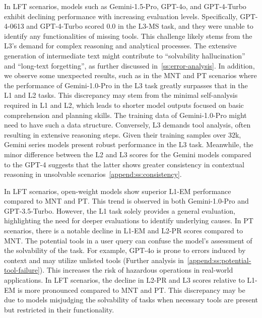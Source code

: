 \documentclass[11pt]{article}
\begin{document}
In LFT scenarios, models such as Gemini-1.5-Pro, GPT-4o, and GPT-4-Turbo exhibit declining performance with increasing evaluation levels. 
Specifically, GPT-4-0613 and GPT-4-Turbo scored $0.0$ in the L3-MS task, and they were unable to identify any functionalities of missing tools.
This challenge likely stems from the L3's demand for complex reasoning and analytical processes. 
The extensive generation of intermediate text might contribute to ``solvability hallucination'' and ``long-text forgetting'', as further discussed in~\cref{ss:error-analysis}.
In addition, we observe some unexpected results, such as in the MNT and PT scenarios where the performance of Gemini-1.0-Pro in the L3 task greatly surpasses that in the L1 and L2 tasks. 
This discrepancy may stem from the minimal self-analysis required in L1 and L2, which leads to shorter model outputs focused on basic comprehension and planning skills. 
The training data of Gemini-1.0-Pro might need to have such a data structure.
Conversely, L3 demands tool analysis, often resulting in extensive reasoning steps. 
Given their training samples over $32$k, Gemini series models present robust performance in the L3 task.
Meanwhile, the minor difference between the L2 and L3 scores for the Gemini models compared to the GPT-4 suggests that the latter shows greater consistency in contextual reasoning in unsolvable scenarios~\cref{append:ss:consistency}.

In LFT scenarios, open-weight models show superior L1-EM performance compared to MNT and PT. 
This trend is observed in both Gemini-1.0-Pro and GPT-3.5-Turbo. 
However, the L1 task solely provides a general evaluation, highlighting the need for deeper evaluations to identify underlying causes.
In PT scenarios, there is a notable decline in L1-EM and L2-PR scores compared to MNT. 
The potential tools in a user query can confuse the model's assessment of the solvability of the task. For example, GPT-4o is prone to errors induced by context and may utilize unlisted tools (Further analysis in~\cref{append:ss:potential-tool-failure}). 
This increases the risk of hazardous operations in real-world applications.
In LFT scenarios, the decline in L2-PR and L3 scores relative to L1-EM is more pronounced compared to MNT and PT. 
This discrepancy may be due to models misjudging the solvability of tasks when necessary tools are present but restricted in their functionality.
\end{document}
